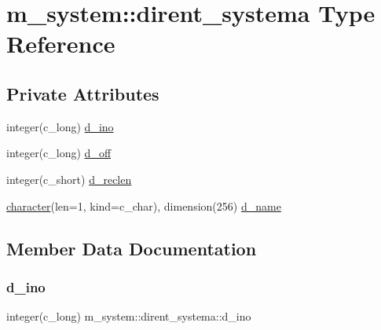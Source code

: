 \hypertarget{structm__system_1_1dirent__systema}{}\section{m\+\_\+system\+:\+:dirent\+\_\+systema Type Reference}
\label{structm__system_1_1dirent__systema}
\subsection*{Private Attributes}
\begin{DoxyCompactItemize}
\item 
integer(c\+\_\+long) \hyperlink{structm__system_1_1dirent__systema_af056795fe78ea5cd27c6763f6136a2ac}{d\+\_\+ino}
\item 
integer(c\+\_\+long) \hyperlink{structm__system_1_1dirent__systema_a4f317f4bd63c3aeca25f5f6df681a7d3}{d\+\_\+off}
\item 
integer(c\+\_\+short) \hyperlink{structm__system_1_1dirent__systema_a74c3e2cb9fd26444b7c7837d4ce69baf}{d\+\_\+reclen}
\item 
\hyperlink{option__stopwatch_83_8txt_abd4b21fbbd175834027b5224bfe97e66}{character}(len=1, kind=c\+\_\+char), dimension(256) \hyperlink{structm__system_1_1dirent__systema_a295bfaa44b4193abef0be4980394a0a3}{d\+\_\+name}
\end{DoxyCompactItemize}


\subsection{Member Data Documentation}
\mbox{\label{structm__system_1_1dirent__systema_af056795fe78ea5cd27c6763f6136a2ac}} 
\subsubsection{\texorpdfstring{d\+\_\+ino}{d\_ino}}
{\footnotesize\ttfamily integer(c\+\_\+long) m\+\_\+system\+::dirent\+\_\+systema\+::d\+\_\+ino\hspace{0.3cm}{\ttfamily [private]}}

\mbox{\label{structm__system_1_1dirent__systema_a295bfaa44b4193abef0be4980394a0a3}} 
